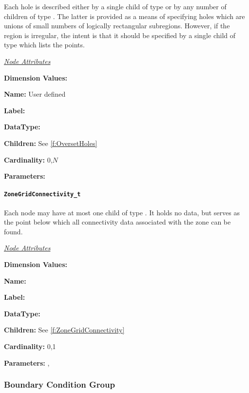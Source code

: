Each hole is described either by a single child of type  or
by any number of children of type . The latter is provided
as a means of specifying holes which are unions of small numbers of
logically rectangular subregions. However, if the region is irregular,
the intent is that it should be specified by a single child of type
 which lists the points.

\textit{\uline{Node Attributes}}
\begin{Ventryic}{\textbf{Dimension Values:}}
\item [\textbf{Name:}]
      User defined
\item [\textbf{Label:}]
\item [\textbf{DataType:}]
\item [\textbf{Children:}]
      See \autoref{f:OversetHoles}
\item [\textbf{Cardinality:}]
      0,$N$
\item [\textbf{Parameters:}]
\end{Ventryic}

\paragraph{\texttt{ZoneGridConnectivity\_t}}

Each  node may have at most one child of type
. It holds no data, but serves as the point
below which all connectivity data associated with the zone can be found.

\textit{\uline{Node Attributes}}
\begin{Ventryic}{\textbf{Dimension Values:}}
\item [\textbf{Name:}]
\item [\textbf{Label:}]
\item [\textbf{DataType:}]
\item [\textbf{Children:}]
      See \autoref{f:ZoneGridConnectivity}
\item [\textbf{Cardinality:}]
      0,1
\item [\textbf{Parameters:}]
      , 
\end{Ventryic}

\subsubsection{Boundary Condition Group}


